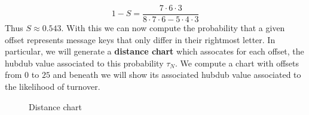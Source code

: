 \[
	1-S = \frac{7\cdot6\cdot3}{8\cdot7\cdot6 - 5\cdot4\cdot3}
\]
Thus $S\approx0.543$. With this we can now compute the probability that a given offset represents message keys that only differ in their rightmost letter. In particular, we will generate a {\bf{distance chart}} which assocates for each offset, the hubdub value associated to this probability $\tau_N$. We compute a chart with offsets from $0$ to $25$ and beneath we will show its associated hubdub value associated to the likelihood of turnover.
\begin{figure}[H]
	\begin{center}
	\end{center}
	\caption{Distance chart}
\end{figure}
